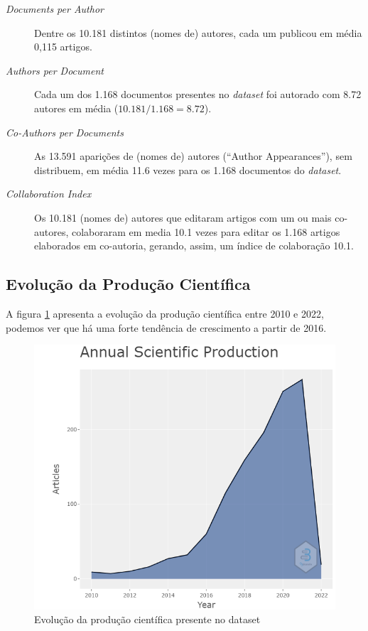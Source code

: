 \begin{description}
    \item [\textit{Documents per Author}] Dentre os 10.181 distintos (nomes de) autores, cada um publicou em média 0,115 artigos.
    \item [\textit{Authors per Document}] Cada um dos 1.168 documentos presentes no \textit{dataset}  foi autorado com 8.72 autores em média ($10.181 / 1.168 = 8.72$).
    \item [\textit{Co-Authors per Documents}] As 13.591 aparições de (nomes de) autores (``Author Appearances''), sem distribuem, em média 11.6 vezes para os 1.168 documentos do \textit{dataset}.
    \item [\textit{Collaboration Index}] Os 10.181 (nomes de) autores que editaram artigos com um ou mais co-autores, colaboraram em media 10.1 vezes para editar os 1.168 artigos elaborados em co-autoria, gerando, assim, um índice de colaboração 10.1. 
    
\end{description}

     
\subsection{Evolução da Produção Científica}
A figura \ref{fig:ev-s-p} apresenta a evolução da produção científica entre 2010 e 2022, podemos ver que há uma forte tendência de crescimento a partir de 2016.

\begin{figure}[ht]
    \centering
    \includegraphics[width=12cm]{experiments/Tong00020/PesquisaBibliometrica/DataSet/MASSA@Tong00020-Annual Scientific Production.png}
    \caption{Evolução da produção científica presente no dataset}
    \label{fig:ev-s-p}
\end{figure}

